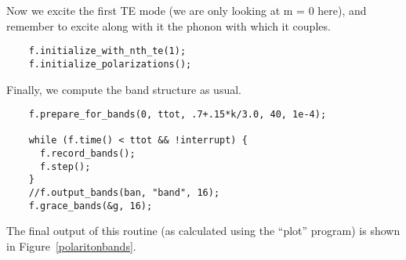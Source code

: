 Now we excite the first TE mode (we are only looking at m = 0 here), and
remember to excite along with it the phonon with which it couples.

\begin{verbatim}
    f.initialize_with_nth_te(1);
    f.initialize_polarizations();
\end{verbatim}

Finally, we compute the band structure as usual.

\begin{verbatim}
    f.prepare_for_bands(0, ttot, .7+.15*k/3.0, 40, 1e-4);
    
    while (f.time() < ttot && !interrupt) {
      f.record_bands();
      f.step();
    }
    //f.output_bands(ban, "band", 16);
    f.grace_bands(&g, 16);
\end{verbatim}
\begin{comment}
    //fflush(ban);
  }
  //fclose(ban);
}
\end{comment}

The final output of this routine (as calculated using the ``plot'' program)
is shown in Figure~\ref{polaritonbands}.
